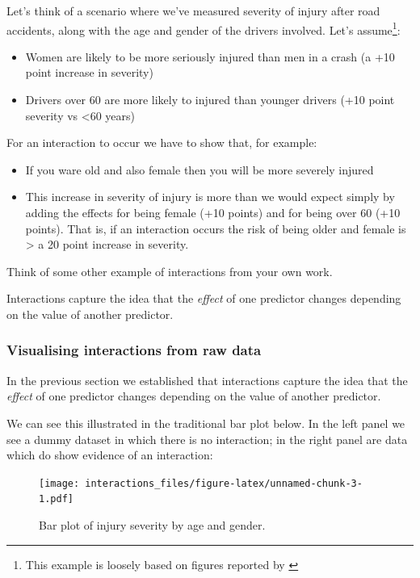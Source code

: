 \documentclass[]{article}
\providecommand{\tightlist}{%
  \setlength{\itemsep}{0pt}\setlength{\parskip}{0pt}}
\let\rmarkdownfootnote\footnote%
\def\footnote{\protect\rmarkdownfootnote}
\theoremstyle{definition}
\theoremstyle{definition}
\theoremstyle{definition}
\theoremstyle{remark}
\begin{document}
Let's think of a scenario where we've measured severity of injury after
road accidents, along with the age and gender of the drivers involved.
Let's assume\footnote{This example is loosely based on figures reported
  by \citet{kockelman2002driver}}:

\begin{itemize}
\tightlist
\item
  Women are likely to be more seriously injured than men in a crash (a
  +10 point increase in severity)
\item
  Drivers over 60 are more likely to injured than younger drivers (+10
  point severity vs \textless{}60 years)
\end{itemize}

For an interaction to occur we have to show that, for example:

\begin{itemize}
\tightlist
\item
  If you ware old and also female then you will be more severely injured
\item
  This increase in severity of injury is more than we would expect
  simply by adding the effects for being female (+10 points) and for
  being over 60 (+10 points). That is, if an interaction occurs the risk
  of being older and female is \textgreater{} a 20 point increase in
  severity.
\end{itemize}

{Think of some other example of interactions from your own work.}

{Interactions capture the idea that the \emph{effect} of one predictor
changes depending on the value of another predictor.}

\subsubsection*{Visualising interactions from raw
data}\label{visualising-interactions-from-raw-data}

In the previous section we established that interactions capture the
idea that the \emph{effect} of one predictor changes depending on the
value of another predictor.

We can see this illustrated in the traditional bar plot below. In the
left panel we see a dummy dataset in which there is no interaction; in
the right panel are data which do show evidence of an interaction:

\begin{figure}
\centering
\texttt{[image: interactions\_files/figure-latex/unnamed-chunk-3-1.pdf]}
\caption{\label{fig:unnamed-chunk-3}Bar plot of injury severity by age and
gender.}
\end{figure}
\end{document}

